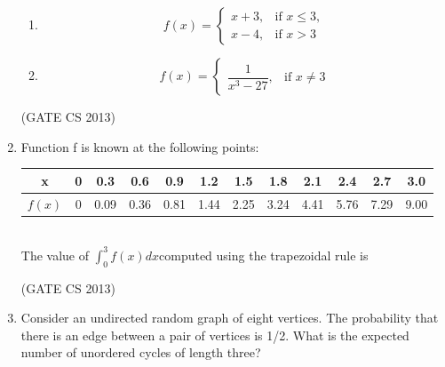 \documentclass[a4paper, 11pt]{article}
\begin{document}
\begin{enumerate}
\begin{enumerate}
    \item  
    \[
    f(x) = 
    \begin{cases} 
    x + 3, & \text{if } x \leq 3,\\ 
    x - 4, & \text{if } x > 3
    \end{cases}
    \]
     
    \item 
    \[
    f(x) =
    \begin{cases} 
    \dfrac{1}{x^3 - 27}, & \text{if } x \neq 3
    \end{cases}
    \]
     
\end{enumerate}

    

    \hfill (GATE CS 2013)
    
    \item Function f is known at the following points:\\
    \begin{tabular}{|c|c|c|c|c|c|c|c|c|c|c|c|}
    \hline
        x & 0 & 0.3 & 0.6 & 0.9 & 1.2 & 1.5 & 1.8 & 2.1 & 2.4 & 2.7 & 3.0  \\
        \hline
        $f(x)$ & 0 & 0.09 & 0.36 & 0.81 & 1.44 & 2.25 & 3.24 & 4.41 & 5.76 & 7.29 & 9.00 \\
        \hline
    \end{tabular}\\
    The value of $\int_{0}^{3} f(x)dx$computed using the trapezoidal rule is 
    \begin{enumerate}
    \end{enumerate}

    \hfill (GATE CS 2013)
    
    \item Consider an undirected random graph of eight vertices. The probability that there is an edge between a pair of vertices is 1/2. What is the expected number of unordered cycles of length three?
    \begin{enumerate}
    \end{enumerate}


\end{enumerate}
\end{document}

